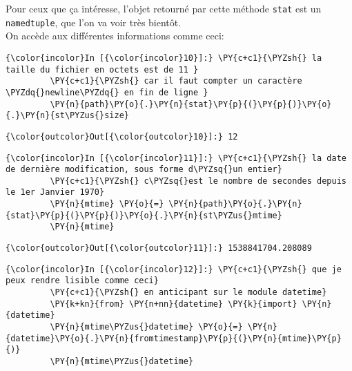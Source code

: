     Pour ceux que ça intéresse, l'objet retourné par cette méthode
\texttt{stat} est un \texttt{namedtuple}, que l'on va voir très bientôt.\\

On accède aux différentes informations comme ceci:

    \begin{Verbatim}[commandchars=\\\{\}]
{\color{incolor}In [{\color{incolor}10}]:} \PY{c+c1}{\PYZsh{} la taille du fichier en octets est de 11 }
         \PY{c+c1}{\PYZsh{} car il faut compter un caractère \PYZdq{}newline\PYZdq{} en fin de ligne }
         \PY{n}{path}\PY{o}{.}\PY{n}{stat}\PY{p}{(}\PY{p}{)}\PY{o}{.}\PY{n}{st\PYZus{}size}
\end{Verbatim}


\begin{Verbatim}[commandchars=\\\{\}]
{\color{outcolor}Out[{\color{outcolor}10}]:} 12
\end{Verbatim}
            
    \begin{Verbatim}[commandchars=\\\{\}]
{\color{incolor}In [{\color{incolor}11}]:} \PY{c+c1}{\PYZsh{} la date de dernière modification, sous forme d\PYZsq{}un entier}
         \PY{c+c1}{\PYZsh{} c\PYZsq{}est le nombre de secondes depuis le 1er Janvier 1970}
         \PY{n}{mtime} \PY{o}{=} \PY{n}{path}\PY{o}{.}\PY{n}{stat}\PY{p}{(}\PY{p}{)}\PY{o}{.}\PY{n}{st\PYZus{}mtime}
         \PY{n}{mtime}
\end{Verbatim}


\begin{Verbatim}[commandchars=\\\{\}]
{\color{outcolor}Out[{\color{outcolor}11}]:} 1538841704.208089
\end{Verbatim}
            
    \begin{Verbatim}[commandchars=\\\{\}]
{\color{incolor}In [{\color{incolor}12}]:} \PY{c+c1}{\PYZsh{} que je peux rendre lisible comme ceci}
         \PY{c+c1}{\PYZsh{} en anticipant sur le module datetime}
         \PY{k+kn}{from} \PY{n+nn}{datetime} \PY{k}{import} \PY{n}{datetime}
         \PY{n}{mtime\PYZus{}datetime} \PY{o}{=} \PY{n}{datetime}\PY{o}{.}\PY{n}{fromtimestamp}\PY{p}{(}\PY{n}{mtime}\PY{p}{)}
         \PY{n}{mtime\PYZus{}datetime}
\end{Verbatim}


